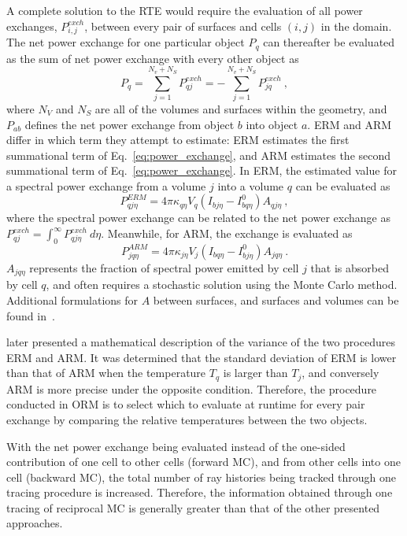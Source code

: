 A complete solution to the RTE would require the evaluation of all power exchanges, $P_{i,j}^{exch}$, between every pair of surfaces and cells $(i,j)$ in the domain.
The net power exchange for one particular object $P_q$ can thereafter be evaluated as the sum of net power exchange with every other object as
\begin{equation}
    P_q=\sum_{j=1}^{N_v+N_S}P_{qj}^{exch}=-\sum_{j=1}^{N_v+N_S}P_{jq}^{exch}~,
    \label{eq:power_exchange}
\end{equation}
where $N_V$ and $N_S$ are all of the volumes and surfaces within the geometry, and
$P_{ab}$ defines the net power exchange from object $b$ into object $a$.
ERM and ARM differ in which term they attempt to estimate: ERM estimates the first summational term of Eq.~\ref{eq:power_exchange}, and ARM estimates the second summational term of Eq.~\ref{eq:power_exchange}.
In ERM, the estimated value for a spectral power exchange from a volume $j$ into a volume $q$ can be evaluated as
\begin{equation}
    P_{qj\eta}^{ERM}=4\pi{}\kappa_{q\eta}V_q(I_{bj\eta}-I^0_{bq\eta})A_{qj\eta}~,
    \label{eq:fraction_spectralpower_ERM}
\end{equation}
where the spectral power exchange can be related to the net power exchange as $P_{qj}^{exch}=\int_0^\infty{}P_{qj\eta}^{exch}~d\eta$.
Meanwhile, for ARM, the exchange is evaluated as
\begin{equation}
    P_{jq\eta}^{ARM}=4\pi{}\kappa_{j\eta}V_j(I_{bq\eta}-I^0_{bj\eta})A_{jq\eta}~.
    \label{eq:power_exchange_ARM}
\end{equation}
$A_{jq\eta}$ represents the fraction of spectral power emitted by cell $j$ that is absorbed by cell $q$, and often requires a stochastic solution using the Monte Carlo method. Additional formulations for $A$ between surfaces, and surfaces and volumes can be found in~\citet{Dupoirieux2006AnThicknesses}.

\citet{Dupoirieux2006AnThicknesses} later presented a mathematical description of the variance of the two procedures ERM and ARM. It was determined that the standard deviation of ERM is lower than that of ARM when the temperature $T_q$ is larger than $T_j$, and conversely ARM is more precise under the opposite condition.
Therefore, the procedure conducted in ORM is to select which to evaluate at runtime for every pair exchange by comparing the relative temperatures between the two objects.

With the net power exchange being evaluated instead of the one-sided contribution of one cell to other cells (forward MC), and from other cells into one cell (backward MC), the total number of ray histories being tracked through one tracing procedure is increased.
Therefore, the information obtained through one tracing of reciprocal MC is generally greater than that of the other presented approaches.

